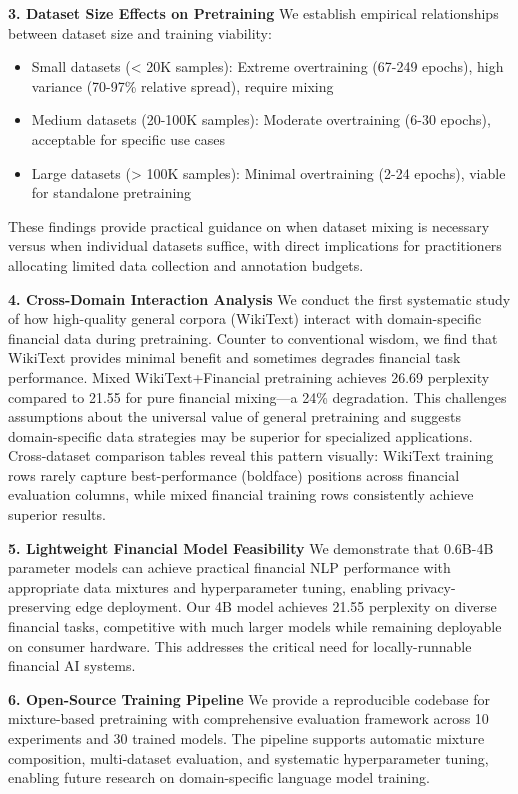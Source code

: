 \textbf{3. Dataset Size Effects on Pretraining}
We establish empirical relationships between dataset size and training viability:
\begin{itemize}
    \item Small datasets (< 20K samples): Extreme overtraining (67-249 epochs), high variance (70-97\% relative spread), require mixing
    \item Medium datasets (20-100K samples): Moderate overtraining (6-30 epochs), acceptable for specific use cases
    \item Large datasets (> 100K samples): Minimal overtraining (2-24 epochs), viable for standalone pretraining
\end{itemize}
These findings provide practical guidance on when dataset mixing is necessary versus when individual datasets suffice, with direct implications for practitioners allocating limited data collection and annotation budgets.

\textbf{4. Cross-Domain Interaction Analysis}
We conduct the first systematic study of how high-quality general corpora (WikiText) interact with domain-specific financial data during pretraining. Counter to conventional wisdom, we find that WikiText provides minimal benefit and sometimes degrades financial task performance. Mixed WikiText+Financial pretraining achieves 26.69 perplexity compared to 21.55 for pure financial mixing—a 24\% degradation. This challenges assumptions about the universal value of general pretraining and suggests domain-specific data strategies may be superior for specialized applications. Cross-dataset comparison tables reveal this pattern visually: WikiText training rows rarely capture best-performance (boldface) positions across financial evaluation columns, while mixed financial training rows consistently achieve superior results.

\textbf{5. Lightweight Financial Model Feasibility}
We demonstrate that 0.6B-4B parameter models can achieve practical financial NLP performance with appropriate data mixtures and hyperparameter tuning, enabling privacy-preserving edge deployment. Our 4B model achieves 21.55 perplexity on diverse financial tasks, competitive with much larger models while remaining deployable on consumer hardware. This addresses the critical need for locally-runnable financial AI systems.

\textbf{6. Open-Source Training Pipeline}
We provide a reproducible codebase for mixture-based pretraining with comprehensive evaluation framework across 10 experiments and 30 trained models. The pipeline supports automatic mixture composition, multi-dataset evaluation, and systematic hyperparameter tuning, enabling future research on domain-specific language model training.

